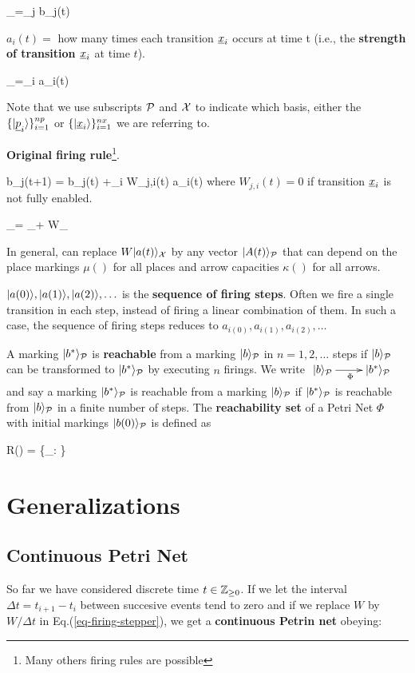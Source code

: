 \beq
{}_\calp =\sum_j b_j(t) 
\eeq

$a_i(t) =$ how many times each transition $\rvx_i$
occurs at time t
(i.e., the {\bf strength of transition $\rvx_i$}
at time $t$).

\beq
{}_\calx =\sum_i a_i(t) 
\eeq

Note that we use subscripts ${\cal P}$ and ${\cal X}$ to
indicate which basis, either the $\{\ket{\rvp_i}\}_{i=1}^{np}$
or  $\{\ket{\rvx_i}\}_{i=1}^{nx}$
we are referring to.

{\bf Original firing rule}\footnote{Many others firing rules are possible}.

\beq
b_j(t+1) = b_j(t)
+\sum_i W_{j,i}(t) a_i(t)
\eeq
where $W_{j,i}(t)=0$ if 
transition $\rvx_i$ 
is not fully enabled.
 
\beq
{}_\calp =
_\calp +
W_\calx
\label{eq-firing-stepper}
\eeq
 
 In general, can replace $W|a(t)\rangle_{\cal X}$ by
 any vector 
 $|A(t)\rangle_{\cal P}$ that can depend on
 the place markings $\mu()$
 for all places
 and
 arrow capacities
 $\kappa()$
 for
 all arrows.

$|a(0)\rangle, |a(1)\rangle, |a(2)\rangle,
\ldots$ is the {\bf sequence of firing
steps}.
Often we fire a single transition
in each step,
instead of firing a linear combination 
of them. In such a case, the
sequence of firing steps reduces to
$a_{i(0)}, a_{i(1)}, a_{i(2)},
\ldots$


A marking $|b^*\rangle_{\cal P}$ is {\bf reachable} from a marking  $|b\rangle_{\cal P}$ in 
$n = 1, 2, \ldots$  steps if
$|b\rangle_{\cal P}$ can be transformed to $|b^*\rangle_{\cal P}$ by executing $n$ firings. We write 
$\xymatrix{\ket{b}_\calp\ar[r]_\Phi& \ket{b^*}_\calp}$ and say a
marking $|b^*\rangle_{\cal P}$ is reachable from a marking
$|b\rangle_{\cal P}$ if $|b^*\rangle_{\cal P}$ is reachable from 
$|b\rangle_{\cal P}$ in a finite
number of steps.
The {\bf reachability set} of a Petri Net $\Phi$ with 
initial markings $|b(0)\rangle_{\cal P}$ is defined as

\beq
R(\Phi) = \{_\calp: 
 \}
\eeq



\section{Generalizations}
\subsection{Continuous Petri Net}
So far we have considered
discrete time $t\in {\mathbb{Z}}_{\geq 0}$.
If we let the interval $\Delta t=t_{i+1}-t_i$ between
succesive events tend to zero
and if we replace $W$ by 
$W/\Delta t$ in Eq.(\ref{eq-firing-stepper}), we get
a {\bf continuous Petrin net} obeying:

